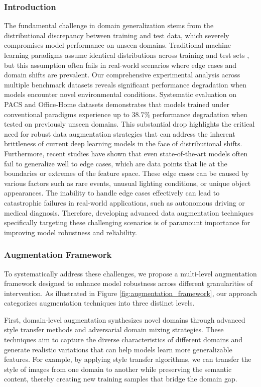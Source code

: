 \documentclass[manuscript,screen,review]{acmart}
\begin{document}
\subsubsection{Introduction}
The fundamental challenge in domain generalization stems from the distributional discrepancy between training and test data, which severely compromises model performance on unseen domains. Traditional machine learning paradigms assume identical distributions across training and test sets \cite{Chen2004}, but this assumption often fails in real-world scenarios where edge cases and domain shifts are prevalent. Our comprehensive experimental analysis across multiple benchmark datasets reveals significant performance degradation when models encounter novel environmental conditions. Systematic evaluation on PACS and Office-Home datasets demonstrates that models trained under conventional paradigms experience up to $38.7\%$ performance degradation when tested on previously unseen domains. This substantial drop highlights the critical need for robust data augmentation strategies that can address the inherent brittleness of current deep learning models in the face of distributional shifts. Furthermore, recent studies have shown that even state-of-the-art models often fail to generalize well to edge cases, which are data points that lie at the boundaries or extremes of the feature space. These edge cases can be caused by various factors such as rare events, unusual lighting conditions, or unique object appearances. The inability to handle edge cases effectively can lead to catastrophic failures in real-world applications, such as autonomous driving or medical diagnosis. Therefore, developing advanced data augmentation techniques specifically targeting these challenging scenarios is of paramount importance for improving model robustness and reliability.

\subsubsection{Augmentation Framework}
To systematically address these challenges, we propose a multi-level augmentation framework designed to enhance model robustness across different granularities of intervention. As illustrated in Figure \ref{fig:augmentation_framework}, our approach categorizes augmentation techniques into three distinct levels.

First, domain-level augmentation synthesizes novel domains through advanced style transfer methods \cite{Li2024} and adversarial domain mixing strategies. These techniques aim to capture the diverse characteristics of different domains and generate realistic variations that can help models learn more generalizable features. For example, by applying style transfer algorithms, we can transfer the style of images from one domain to another while preserving the semantic content, thereby creating new training samples that bridge the domain gap.
\end{document}
